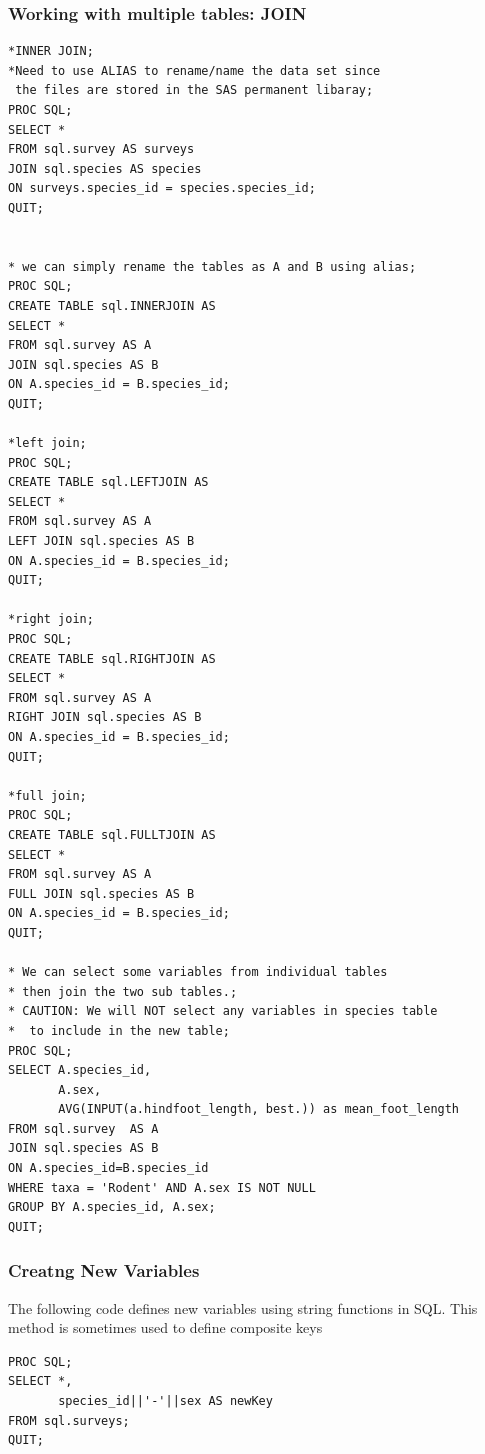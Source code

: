 \documentclass[
]{book}
\begin{document}
\hypertarget{working-with-multiple-tables-join}{%
\subsubsection{Working with multiple tables: JOIN}\label{working-with-multiple-tables-join}}

\begin{verbatim}
*INNER JOIN;
*Need to use ALIAS to rename/name the data set since
 the files are stored in the SAS permanent libaray;
PROC SQL;
SELECT *
FROM sql.survey AS surveys
JOIN sql.species AS species
ON surveys.species_id = species.species_id;
QUIT;


* we can simply rename the tables as A and B using alias;
PROC SQL;
CREATE TABLE sql.INNERJOIN AS
SELECT *
FROM sql.survey AS A
JOIN sql.species AS B
ON A.species_id = B.species_id;
QUIT;

*left join;
PROC SQL;
CREATE TABLE sql.LEFTJOIN AS
SELECT *
FROM sql.survey AS A
LEFT JOIN sql.species AS B
ON A.species_id = B.species_id;
QUIT;

*right join;
PROC SQL;
CREATE TABLE sql.RIGHTJOIN AS
SELECT *
FROM sql.survey AS A
RIGHT JOIN sql.species AS B
ON A.species_id = B.species_id;
QUIT;

*full join;
PROC SQL;
CREATE TABLE sql.FULLTJOIN AS
SELECT *
FROM sql.survey AS A
FULL JOIN sql.species AS B
ON A.species_id = B.species_id;
QUIT;

* We can select some variables from individual tables
* then join the two sub tables.;
* CAUTION: We will NOT select any variables in species table 
*  to include in the new table;
PROC SQL;
SELECT A.species_id, 
       A.sex, 
       AVG(INPUT(a.hindfoot_length, best.)) as mean_foot_length  
FROM sql.survey  AS A
JOIN sql.species AS B
ON A.species_id=B.species_id 
WHERE taxa = 'Rodent' AND A.sex IS NOT NULL 
GROUP BY A.species_id, A.sex;
QUIT;
\end{verbatim}

\hypertarget{creatng-new-variables}{%
\subsubsection{Creatng New Variables}\label{creatng-new-variables}}

The following code defines new variables using string functions in SQL. This method is sometimes used to define composite keys

\begin{verbatim}
PROC SQL;
SELECT *, 
       species_id||'-'||sex AS newKey
FROM sql.surveys;
QUIT;
\end{verbatim}
\end{document}
